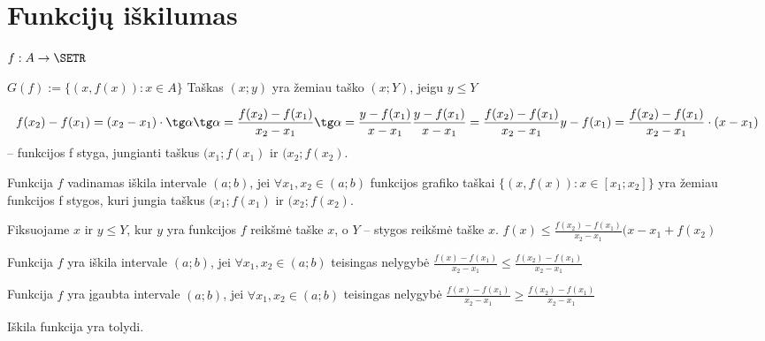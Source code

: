 \chapter{Funkcijų iškilumas}
$f : A \to \SETR$
\begin{defn}
  $G(f) := \{ (x, f(x)) : x \in A \}$
  Taškas $(x; y)$ yra žemiau taško $(x; Y)$, jeigu $y \leq Y$
\end{defn}

\[
  f(x_2) - f(x_1) = (x_2 - x_1) \cdot \tg \alpha
  \tg \alpha = \frac{f(x_2) - f(x_1)}{x_2 - x_1}
  \tg \alpha = \frac{y - f(x_1)}{x - x_1}
  \frac{y - f(x_1)}{x - x_1} = \frac{f(x_2) - f(x_1)}{x_2 - x_1}
  y - f(x_1) = \frac{f(x_2) - f(x_1)}{x_2 - x_1} \cdot (x - x_1)
\] – funkcijos f styga, jungianti taškus $(x_1; f(x_1)$ ir $(x_2; f(x_2)$.

\begin{defn}
  Funkcija $f$ vadinamas iškila intervale $(a; b)$, jei
  $\forall x_1, x_2 \in (a; b)$ funkcijos grafiko taškai
  $\{(x, f(x)): x \in [x_1; x_2]\}$ yra žemiau funkcijos f stygos, kuri
  jungia taškus $(x_1; f(x_1)$ ir $(x_2; f(x_2)$.

  Fiksuojame $x$ ir $y \leq Y$, kur $y$ yra funkcijos $f$ reikšmė taške $x$,
  o $Y$ – stygos reikšmė taške $x$.
  $f(x) \leq \frac{f(x_2) - f(x_1)}{x_2 - x_1}(x - x_1 + f(x_2)$
\end{defn}

\begin{defn}
  Funkcija $f$ yra iškila intervale $(a; b)$, jei
  $\forall x_1, x_2 \in (a; b)$ teisingas nelygybė
  $\frac{f(x) - f(x_1)}{x_2 - x_1} \leq \frac{f(x_2) - f(x_1)}{x_2 - x_1}$
\end{defn}

\begin{defn}
  Funkcija $f$ yra įgaubta intervale $(a; b)$, jei
  $\forall x_1, x_2 \in (a; b)$ teisingas nelygybė
  $\frac{f(x) - f(x_1)}{x_2 - x_1} \geq \frac{f(x_2) - f(x_1)}{x_2 - x_1}$
\end{defn}

\begin{prop}
  Iškila funkcija yra tolydi.
\end{prop}

